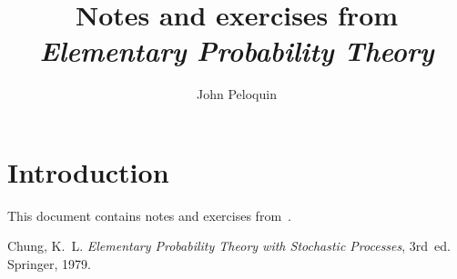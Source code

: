 \documentclass[letterpaper,12pt]{article}
\title{Notes and exercises from\\\textit{Elementary Probability Theory}}
\author{John Peloquin}
\date{}
\theoremstyle{definition}
\theoremstyle{remark}
\begin{document}
\maketitle

\section*{Introduction}
This document contains notes and exercises from~\cite{chung}.

\begin{thebibliography}{0}
 Chung, K.~L. \textit{Elementary Probability Theory with Stochastic Processes}, 3rd~ed. Springer, 1979.
\end{thebibliography}
\end{document}
